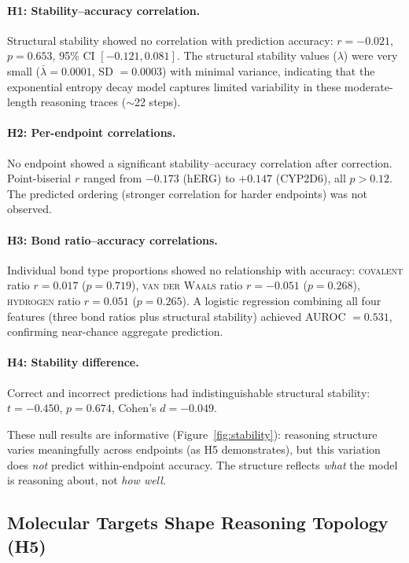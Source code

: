 \documentclass[11pt]{article}
\newcommand{\cov}{\textsc{covalent}}
\newcommand{\hyd}{\textsc{hydrogen}}
\newcommand{\vdw}{\textsc{van der Waals}}
\begin{document}
\paragraph{H1: Stability--accuracy correlation.} Structural stability showed no correlation with prediction accuracy: $r = -0.021$, $p = 0.653$, 95\% CI $[-0.121, 0.081]$. The structural stability values ($\lambda$) were very small ($\bar{\lambda} = 0.0001$, SD $= 0.0003$) with minimal variance, indicating that the exponential entropy decay model captures limited variability in these moderate-length reasoning traces ($\sim$22 steps).

\paragraph{H2: Per-endpoint correlations.} No endpoint showed a significant stability--accuracy correlation after correction. Point-biserial $r$ ranged from $-0.173$ (hERG) to $+0.147$ (CYP2D6), all $p > 0.12$. The predicted ordering (stronger correlation for harder endpoints) was not observed.

\paragraph{H3: Bond ratio--accuracy correlations.} Individual bond type proportions showed no relationship with accuracy: \cov{} ratio $r = 0.017$ ($p = 0.719$), \vdw{} ratio $r = -0.051$ ($p = 0.268$), \hyd{} ratio $r = 0.051$ ($p = 0.265$). A logistic regression combining all four features (three bond ratios plus structural stability) achieved AUROC $= 0.531$, confirming near-chance aggregate prediction.

\paragraph{H4: Stability difference.} Correct and incorrect predictions had indistinguishable structural stability: $t = -0.450$, $p = 0.674$, Cohen's $d = -0.049$.

\medskip
\noindent These null results are informative (Figure~\ref{fig:stability}): reasoning structure varies meaningfully across endpoints (as H5 demonstrates), but this variation does \emph{not} predict within-endpoint accuracy. The structure reflects \emph{what} the model is reasoning about, not \emph{how well}.

\subsection{Molecular Targets Shape Reasoning Topology (H5)}
\label{sec:h5}
\end{document}
